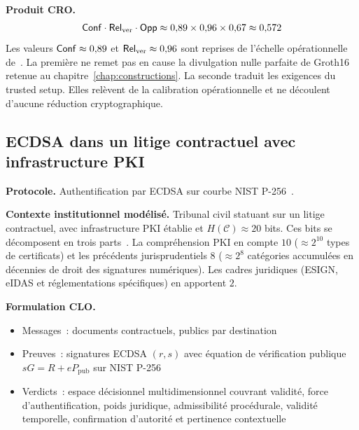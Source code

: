 \begin{sloppypar}
\noindent\textbf{Produit CRO.}
\begin{equation}
\mathsf{Conf} \cdot \mathsf{Rel}_{\mathrm{ver}} \cdot \mathsf{Opp}
\approx 0{,}89 \times 0{,}96 \times 0{,}67 \approx 0{,}572
\label{eq:produit_zksnark}
\end{equation}
Les valeurs $\mathsf{Conf} \approx 0{,}89$ et $\mathsf{Rel}_{\mathrm{ver}} \approx 0{,}96$ sont reprises de
l'\'echelle op\'erationnelle de~\cite{MINKA2026CLO}. La premi\`ere ne remet pas en cause la divulgation
nulle parfaite de Groth16 retenue au chapitre~\ref{chap:constructions}. La seconde traduit les
exigences du trusted setup. Elles rel\`event de la calibration op\'erationnelle et ne
d\'ecoulent d'aucune r\'eduction cryptographique.

\subsection{ECDSA dans un litige contractuel avec infrastructure PKI}
\label{sec:derivation_ecdsa}

\noindent\textbf{Protocole.} Authentification par ECDSA sur courbe NIST
P-256~\cite{Johnson01}.

\noindent\textbf{Contexte institutionnel mod\'elis\'e.} Tribunal civil statuant
sur un litige contractuel, avec infrastructure PKI \'etablie et
$H(\mathcal{C}) \approx 20$ bits. Ces bits se d\'ecomposent en trois parts~\cite{MINKA2026CLO}. La compr\'ehension PKI en compte $10$
($\approx 2^{10}$ types de certificats) et les pr\'ec\'edents
jurisprudentiels $8$ ($\approx 2^{8}$ cat\'egories accumul\'ees en d\'ecennies de
droit des signatures num\'eriques). Les cadres juridiques (ESIGN, eIDAS et
r\'eglementations sp\'ecifiques) en apportent $2$.

\noindent\textbf{Formulation CLO.}
\begin{itemize}
\item Messages~: documents contractuels, publics par destination
\item Preuves~: signatures ECDSA $(r, s)$ avec \'equation de v\'erification
      publique $sG = R + eP_{\text{pub}}$ sur NIST P-256
\item Verdicts~: espace d\'ecisionnel multidimensionnel couvrant validit\'e,
      force d'authentification, poids juridique, admissibilit\'e proc\'edurale,
      validit\'e temporelle, confirmation d'autorit\'e et pertinence contextuelle
\end{itemize}


\end{sloppypar}
